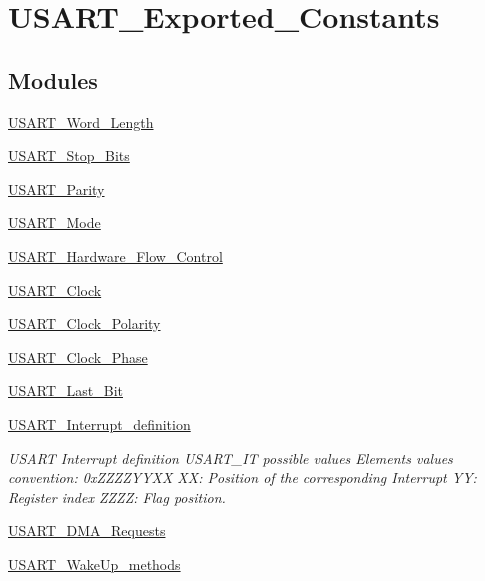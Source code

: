\hypertarget{group___u_s_a_r_t___exported___constants}{\section{U\-S\-A\-R\-T\-\_\-\-Exported\-\_\-\-Constants}
\label{group___u_s_a_r_t___exported___constants}
}
\subsection*{Modules}
\begin{DoxyCompactItemize}
\item 
\hyperlink{group___u_s_a_r_t___word___length}{U\-S\-A\-R\-T\-\_\-\-Word\-\_\-\-Length}
\item 
\hyperlink{group___u_s_a_r_t___stop___bits}{U\-S\-A\-R\-T\-\_\-\-Stop\-\_\-\-Bits}
\item 
\hyperlink{group___u_s_a_r_t___parity}{U\-S\-A\-R\-T\-\_\-\-Parity}
\item 
\hyperlink{group___u_s_a_r_t___mode}{U\-S\-A\-R\-T\-\_\-\-Mode}
\item 
\hyperlink{group___u_s_a_r_t___hardware___flow___control}{U\-S\-A\-R\-T\-\_\-\-Hardware\-\_\-\-Flow\-\_\-\-Control}
\item 
\hyperlink{group___u_s_a_r_t___clock}{U\-S\-A\-R\-T\-\_\-\-Clock}
\item 
\hyperlink{group___u_s_a_r_t___clock___polarity}{U\-S\-A\-R\-T\-\_\-\-Clock\-\_\-\-Polarity}
\item 
\hyperlink{group___u_s_a_r_t___clock___phase}{U\-S\-A\-R\-T\-\_\-\-Clock\-\_\-\-Phase}
\item 
\hyperlink{group___u_s_a_r_t___last___bit}{U\-S\-A\-R\-T\-\_\-\-Last\-\_\-\-Bit}
\item 
\hyperlink{group___u_s_a_r_t___interrupt__definition}{U\-S\-A\-R\-T\-\_\-\-Interrupt\-\_\-definition}
\begin{DoxyCompactList}\small\item\em U\-S\-A\-R\-T Interrupt definition U\-S\-A\-R\-T\-\_\-\-I\-T possible values Elements values convention\-: 0x\-Z\-Z\-Z\-Z\-Y\-Y\-X\-X X\-X\-: Position of the corresponding Interrupt Y\-Y\-: Register index Z\-Z\-Z\-Z\-: Flag position. \end{DoxyCompactList}\item 
\hyperlink{group___u_s_a_r_t___d_m_a___requests}{U\-S\-A\-R\-T\-\_\-\-D\-M\-A\-\_\-\-Requests}
\item 
\hyperlink{group___u_s_a_r_t___wake_up__methods}{U\-S\-A\-R\-T\-\_\-\-Wake\-Up\-\_\-methods}

\end{DoxyCompactItemize}
